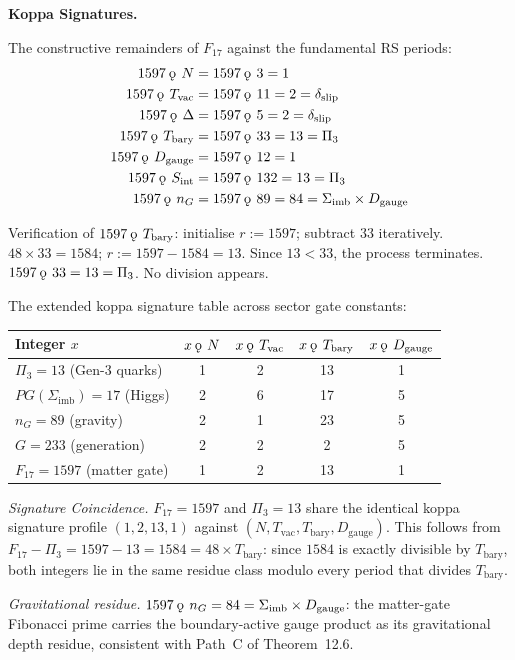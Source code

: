 \documentclass[11pt, letterpaper]{article}
\newcommand{\koppa}{\mathbin{\text{\rm\k{o}}}}
\theoremstyle{definition}
\theoremstyle{plain}
\begin{document}
\begin{rsbox}
\noindent\textbf{Koppa Signatures.}

The constructive remainders of $F_{17}$ against the fundamental RS periods:
\begin{align*}
1597 \koppa\, N      &= 1597 \koppa\, 3  = 1 \\
1597 \koppa\, T_{\mathrm{vac}} &= 1597 \koppa\, 11 = 2 = \delta_{\mathrm{slip}} \\
1597 \koppa\, \Delta &= 1597 \koppa\, 5  = 2 = \delta_{\mathrm{slip}} \\
1597 \koppa\, T_{\mathrm{bary}} &= 1597 \koppa\, 33 = 13 = \Pi_3 \\
1597 \koppa\, D_{\mathrm{gauge}} &= 1597 \koppa\, 12 = 1 \\
1597 \koppa\, S_{\mathrm{int}} &= 1597 \koppa\, 132 = 13 = \Pi_3 \\
1597 \koppa\, n_G   &= 1597 \koppa\, 89  = 84 = \Sigma_{\mathrm{imb}} \times D_{\mathrm{gauge}}
\end{align*}

Verification of $1597 \koppa\, T_{\mathrm{bary}}$: initialise $r := 1597$; subtract $33$
iteratively. $48 \times 33 = 1584$; $r := 1597 - 1584 = 13$. Since $13 < 33$, the process
terminates. $1597 \koppa\, 33 = 13 = \Pi_3$. No division appears.

The extended koppa signature table across sector gate constants:

\begin{center}
\begin{tabular}{lcccc}
\hline
Integer $x$ & $x \koppa\, N$ & $x \koppa\, T_{\mathrm{vac}}$ &
$x \koppa\, T_{\mathrm{bary}}$ & $x \koppa\, D_{\mathrm{gauge}}$ \\
\hline
$\Pi_3 = 13$ (Gen-3 quarks)      & 1 & 2 & 13 & 1 \\
$PG(\Sigma_{\mathrm{imb}}) = 17$ (Higgs) & 2 & 6 & 17 & 5 \\
$n_G = 89$ (gravity)             & 2 & 1 & 23 & 5 \\
$G = 233$ (generation)           & 2 & 2 &  2 & 5 \\
$F_{17} = 1597$ (matter gate)    & 1 & 2 & 13 & 1 \\
\hline
\end{tabular}
\end{center}

\noindent\textit{Signature Coincidence.} $F_{17} = 1597$ and $\Pi_3 = 13$ share the
identical koppa signature profile $(1, 2, 13, 1)$ against $(N, T_{\mathrm{vac}},
T_{\mathrm{bary}}, D_{\mathrm{gauge}})$. This follows from
$F_{17} - \Pi_3 = 1597 - 13 = 1584 = 48 \times T_{\mathrm{bary}}$: since $1584$ is
exactly divisible by $T_{\mathrm{bary}}$, both integers lie in the same residue class
modulo every period that divides $T_{\mathrm{bary}}$.

\noindent\textit{Gravitational residue.} $1597 \koppa\, n_G = 84 = \Sigma_{\mathrm{imb}}
\times D_{\mathrm{gauge}}$: the matter-gate Fibonacci prime carries the boundary-active
gauge product as its gravitational depth residue, consistent with Path~C of Theorem~12.6.
\end{rsbox}
\end{document}
